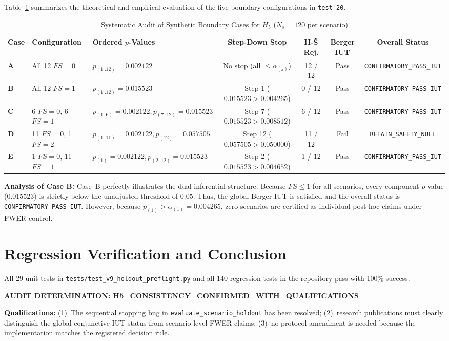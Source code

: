 \documentclass[10pt,a4paper]{article}
\begin{document}
Table~\ref{tab:cases_audit} summarizes the theoretical and empirical evaluation of the five boundary configurations in \texttt{test\_20}.

\begin{table}[htbp]
\centering
\small
\caption{Systematic Audit of Synthetic Boundary Cases for $H_5$ ($N_s = 120$ per scenario)}
\label{tab:cases_audit}
\begin{tabularx}{\textwidth}{llXcccc}
\toprule
\textbf{Case} & \textbf{Configuration} & \textbf{Ordered $p$-Values} & \textbf{Step-Down Stop} & \textbf{H-Š Rej.} & \textbf{Berger IUT} & \textbf{Overall Status} \\
\midrule
\textbf{A} & All 12 $FS = 0$ & $p_{(1..12)} = 0.002122$ & No stop (all $\le \alpha_{(j)}$) & 12 / 12 & Pass & \texttt{CONFIRMATORY\_PASS\_IUT} \\
\textbf{B} & All 12 $FS = 1$ & $p_{(1..12)} = 0.015523$ & Step 1 ($0.015523 > 0.004265$) & 0 / 12 & Pass & \texttt{CONFIRMATORY\_PASS\_IUT} \\
\textbf{C} & 6 $FS=0$, 6 $FS=1$ & $p_{(1..6)}=0.002122, p_{(7..12)}=0.015523$ & Step 7 ($0.015523 > 0.008512$) & 6 / 12 & Pass & \texttt{CONFIRMATORY\_PASS\_IUT} \\
\textbf{D} & 11 $FS=0$, 1 $FS=2$ & $p_{(1..11)}=0.002122, p_{(12)}=0.057505$ & Step 12 ($0.057505 > 0.050000$) & 11 / 12 & Fail & \texttt{RETAIN\_SAFETY\_NULL} \\
\textbf{E} & 1 $FS=0$, 11 $FS=1$ & $p_{(1)}=0.002122, p_{(2..12)}=0.015523$ & Step 2 ($0.015523 > 0.004652$) & 1 / 12 & Pass & \texttt{CONFIRMATORY\_PASS\_IUT} \\
\bottomrule
\end{tabularx}
\end{table}

\noindent \textbf{Analysis of Case B:} Case~B perfectly illustrates the dual inferential structure. Because $FS \le 1$ for all scenarios, every component $p$-value ($0.015523$) is strictly below the unadjusted threshold of $0.05$. Thus, the global Berger IUT is satisfied and the overall status is \texttt{CONFIRMATORY\_PASS\_IUT}. However, because $p_{(1)} > \alpha_{(1)} = 0.004265$, zero scenarios are certified as individual post-hoc claims under FWER control.

\section{Regression Verification and Conclusion}
All 29 unit tests in \texttt{tests/test\_v9\_holdout\_preflight.py} and all 140 regression tests in the repository pass with 100\% success.

\begin{center}
\large \textbf{AUDIT DETERMINATION: H5\_CONSISTENCY\_CONFIRMED\_WITH\_QUALIFICATIONS}
\end{center}

\noindent \textbf{Qualifications:} (1)~The sequential stopping bug in \texttt{evaluate\_scenario\_holdout} has been resolved; (2)~research publications must clearly distinguish the global conjunctive IUT status from scenario-level FWER claims; (3)~no protocol amendment is needed because the implementation matches the registered decision rule.
\end{document}
